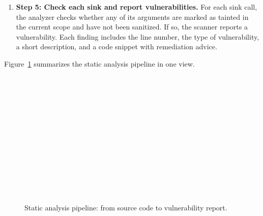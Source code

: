 \begin{enumerate}
  \item \textbf{Step 5: Check each sink and report vulnerabilities.}
  For each sink call, the analyzer checks whether any of its arguments are marked as tainted
  in the current scope and have not been sanitized. If so, the scanner reports a vulnerability.
  Each finding includes the line number, the type of vulnerability, a short description, and
  a code snippet with remediation advice.
\end{enumerate}

Figure~\ref{fig:static_pipeline} summarizes the static analysis pipeline in one view.

\begin{figure}[htbp]
  \centering
  \small
  \setlength{\fboxsep}{4pt}
  \newcommand{\flowdown}{\raisebox{0.5ex}{$\downarrow$}}
   \\[0.6ex]
  \flowdown \\[0.3ex]
   \\[0.6ex]
  \flowdown \\[0.3ex]
   \\[0.6ex]
  \flowdown \\[0.3ex]
   \\[0.6ex]
  \flowdown \\[0.3ex]
   \\[0.6ex]
  \flowdown \\[0.3ex]
   \\[0.6ex]
  \flowdown \\[0.3ex]
  \caption{Static analysis pipeline: from source code to vulnerability report.}
  \label{fig:static_pipeline}
\end{figure}

